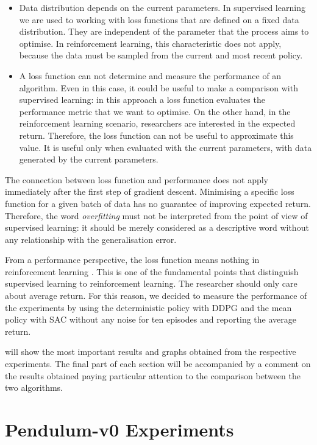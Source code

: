 \begin{itemize}
	\item Data distribution depends on the current parameters. In supervised learning we are used to working with loss functions that are defined on a fixed data distribution. They are independent of the parameter that the process aims to optimise. In reinforcement learning, this characteristic does not apply, because the data must be sampled from the current and most recent policy.
	\item A loss function can not determine and measure the performance of an algorithm. Even in this case, it could be useful to make a comparison with supervised learning: in this approach a loss function evaluates the performance metric that we want to optimise. On the other hand, in the reinforcement learning scenario, researchers are interested in the expected return. Therefore, the loss function can not be useful to approximate this value. It is useful only when evaluated with the current parameters, with data generated by the current parameters.
\end{itemize}

The connection between loss function and performance does not apply immediately after the first step of gradient descent.
Minimising a specific loss function for a given batch of data has no guarantee of improving expected return.
Therefore, the word \textit{overfitting} must not be interpreted from the point of view of supervised learning: it should be merely considered as a descriptive word without any relationship with the generalisation error.

From a performance perspective, the loss function means nothing in reinforcement learning \cite{openai2018spinningup}.
This is one of the fundamental points that distinguish supervised learning to reinforcement learning. The researcher should only care about average return.
For this reason, we decided to measure the performance of the experiments by using the deterministic policy with DDPG and the mean policy with SAC without any noise for ten episodes and reporting the average return.

 will show the most important results and graphs obtained from the respective experiments.
The final part of each section will be accompanied by a comment on the results obtained paying particular attention to the comparison between the two algorithms.

\section{Pendulum-v0 Experiments} \label{sec:pendulum-exp}

